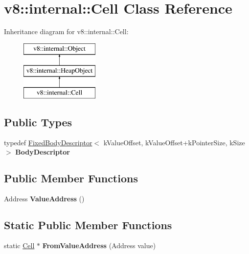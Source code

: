 \hypertarget{classv8_1_1internal_1_1_cell}{}\section{v8\+:\+:internal\+:\+:Cell Class Reference}
\label{classv8_1_1internal_1_1_cell}
Inheritance diagram for v8\+:\+:internal\+:\+:Cell\+:\begin{figure}[H]
\begin{center}
\leavevmode
\includegraphics[height=3.000000cm]{classv8_1_1internal_1_1_cell}
\end{center}
\end{figure}
\subsection*{Public Types}
\begin{DoxyCompactItemize}
\item 
typedef \hyperlink{classv8_1_1internal_1_1_fixed_body_descriptor}{Fixed\+Body\+Descriptor}$<$ k\+Value\+Offset, k\+Value\+Offset+k\+Pointer\+Size, k\+Size $>$ {\bfseries Body\+Descriptor}\hypertarget{classv8_1_1internal_1_1_cell_aab877bcc5c92876e1a09e984428a63fb}{}\label{classv8_1_1internal_1_1_cell_aab877bcc5c92876e1a09e984428a63fb}

\end{DoxyCompactItemize}
\subsection*{Public Member Functions}
\begin{DoxyCompactItemize}
\item 
Address {\bfseries Value\+Address} ()\hypertarget{classv8_1_1internal_1_1_cell_a118c6eaad39cc63e6468b83a4697edee}{}\label{classv8_1_1internal_1_1_cell_a118c6eaad39cc63e6468b83a4697edee}

\end{DoxyCompactItemize}
\subsection*{Static Public Member Functions}
\begin{DoxyCompactItemize}
\item 
static \hyperlink{classv8_1_1internal_1_1_cell}{Cell} $\ast$ {\bfseries From\+Value\+Address} (Address value)\hypertarget{classv8_1_1internal_1_1_cell_ae7cb48a49636c3389d4dbfa21c06e340}{}\label{classv8_1_1internal_1_1_cell_ae7cb48a49636c3389d4dbfa21c06e340}

\end{DoxyCompactItemize}
